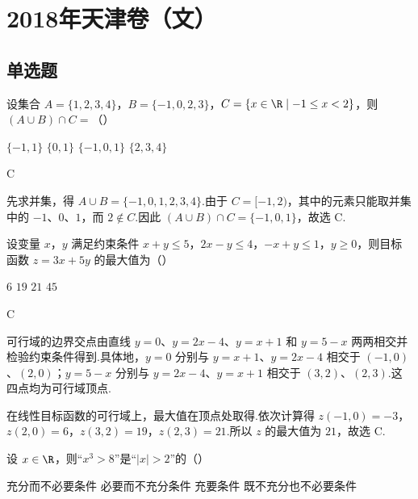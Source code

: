 \chapter{2018年天津卷（文）}

\section{单选题}

\begin{problem}
设集合 \(A=\{1,2,3,4\}\)，\(B=\{-1,0,2,3\}\)，\(C=\{x\in\R\mid -1\le x<2\}\)，则 \((A\cup B)\cap C=\)（\quad）

\choices
    {\(\{-1,1\}\)}
    {\(\{0,1\}\)}
    {\(\{-1,0,1\}\)}
    {\(\{2,3,4\}\)}
\end{problem}

\begin{answer}
C
\end{answer}

\begin{solution}
先求并集，得 \(A\cup B=\{-1,0,1,2,3,4\}\).由于 \(C=[-1,2)\)，其中的元素只能取并集中的 \(-1\)、\(0\)、\(1\)，而 \(2\notin C\).因此 \((A\cup B)\cap C=\{-1,0,1\}\)，故选 C.
\end{solution}

\begin{problem}
设变量 \(x\)，\(y\) 满足约束条件 \(x+y\le5\)，\(2x-y\le4\)，\(-x+y\le1\)，\(y\ge0\)，则目标函数 \(z=3x+5y\) 的最大值为（\quad）

\choices
    {\(6\)}
    {\(19\)}
    {\(21\)}
    {\(45\)}
\end{problem}

\begin{answer}
C
\end{answer}

\begin{solution}
可行域的边界交点由直线 \(y=0\)、\(y=2x-4\)、\(y=x+1\) 和 \(y=5-x\) 两两相交并检验约束条件得到.具体地，\(y=0\) 分别与 \(y=x+1\)、\(y=2x-4\) 相交于 \((-1,0)\)、\((2,0)\)；\(y=5-x\) 分别与 \(y=2x-4\)、\(y=x+1\) 相交于 \((3,2)\)、\((2,3)\).这四点均为可行域顶点.

在线性目标函数的可行域上，最大值在顶点处取得.依次计算得
\(z(-1,0)=-3\)，\(z(2,0)=6\)，\(z(3,2)=19\)，\(z(2,3)=21\).所以 \(z\) 的最大值为 \(21\)，故选 C.
\end{solution}

\begin{problem}
设 \(x\in\R\)，则“\(x^3>8\)”是“\(|x|>2\)”的（\quad）

\choices
    {充分而不必要条件}
    {必要而不充分条件}
    {充要条件}
    {既不充分也不必要条件}
\end{problem}

